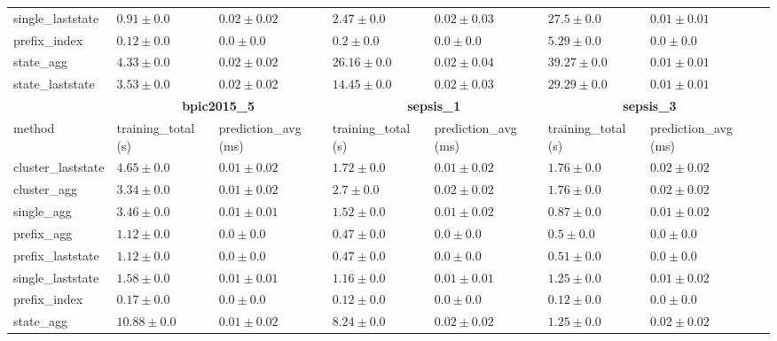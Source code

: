 \documentclass[twoside,11pt]{Latex/Classes/PhDthesisPSnPDF}
\begin{document}
\begin{table}[!htbp]
{\begin{tabular}{llllllll}
			single\_laststate & $0.91 \pm 0.0$ & $0.02 \pm 0.02$ & $2.47 \pm 0.0$ & $0.02 \pm 0.03$ & $27.5 \pm 0.0$ & $0.01 \pm 0.01$ \\ 
			prefix\_index & $\mathbf{0.12 \pm 0.0}$ & $\mathbf{0.0 \pm 0.0}$ & $\mathbf{0.2 \pm 0.0}$ & $\mathbf{0.0 \pm 0.0}$ & $\mathbf{5.29 \pm 0.0}$ & $\mathbf{0.0 \pm 0.0}$ \\ 
			state\_agg & $4.33 \pm 0.0$ & $0.02 \pm 0.02$ & $26.16 \pm 0.0$ & $0.02 \pm 0.04$ & $39.27 \pm 0.0$ & $0.01 \pm 0.01$ \\ 
			state\_laststate & $3.53 \pm 0.0$ & $0.02 \pm 0.02$ & $14.45 \pm 0.0$ & $0.02 \pm 0.03$ & $29.29 \pm 0.0$ & $0.01 \pm 0.01$ \\ 
			\bottomrule
			\toprule
			& \multicolumn{2}{c}{{\bfseries bpic2015\_5}} & \multicolumn{2}{c}{{\bfseries sepsis\_1}} & \multicolumn{2}{c}{{\bfseries sepsis\_3}} \\ \cmidrule(lr){2-3} \cmidrule(lr){4-5} \cmidrule(lr){6-7}
			method  & training\_total (s) & prediction\_avg (ms) & training\_total (s) & prediction\_avg (ms) & training\_total (s) & prediction\_avg (ms) \\ \midrule
			cluster\_laststate & $4.65 \pm 0.0$ & $0.01 \pm 0.02$ & $1.72 \pm 0.0$ & $0.01 \pm 0.02$ & $1.76 \pm 0.0$ & $0.02 \pm 0.02$ \\ 
			cluster\_agg & $3.34 \pm 0.0$ & $0.01 \pm 0.02$ & $2.7 \pm 0.0$ & $0.02 \pm 0.02$ & $1.76 \pm 0.0$ & $0.02 \pm 0.02$ \\ 
			single\_agg & $3.46 \pm 0.0$ & $0.01 \pm 0.01$ & $1.52 \pm 0.0$ & $0.01 \pm 0.02$ & $0.87 \pm 0.0$ & $0.01 \pm 0.02$ \\ 
			prefix\_agg & $1.12 \pm 0.0$ & $\mathbf{0.0 \pm 0.0}$ & $0.47 \pm 0.0$ & $\mathbf{0.0 \pm 0.0}$ & $0.5 \pm 0.0$ & $\mathbf{0.0 \pm 0.0}$ \\ 
			prefix\_laststate & $1.12 \pm 0.0$ & $\mathbf{0.0 \pm 0.0}$ & $0.47 \pm 0.0$ & $\mathbf{0.0 \pm 0.0}$ & $0.51 \pm 0.0$ & $\mathbf{0.0 \pm 0.0}$ \\ 
			single\_laststate & $1.58 \pm 0.0$ & $0.01 \pm 0.01$ & $1.16 \pm 0.0$ & $0.01 \pm 0.01$ & $1.25 \pm 0.0$ & $0.01 \pm 0.02$ \\ 
			prefix\_index & $\mathbf{0.17 \pm 0.0}$ & $\mathbf{0.0 \pm 0.0}$ & $\mathbf{0.12 \pm 0.0}$ & $\mathbf{0.0 \pm 0.0}$ & $\mathbf{0.12 \pm 0.0}$ & $\mathbf{0.0 \pm 0.0}$ \\ 
			state\_agg & $10.88 \pm 0.0$ & $0.01 \pm 0.02$ & $8.24 \pm 0.0$ & $0.02 \pm 0.02$ & $1.25 \pm 0.0$ & $0.02 \pm 0.02$ \\ 

\end{tabular}}
\end{table}
\end{document}
